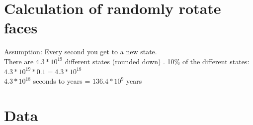 \documentclass[a4paper,11pt]{kth-mag}
\begin{document}
\renewcommand{\bibname}{References}



\appendix
\addappheadtotoc
\chapter{Calculation of randomly rotate faces}\label{appA}
Assumption: Every second you get to a new state.\\
There are $4.3*10^{19}$  different states (rounded down) \cite{Faculty}.
10\% of the different states:\\
$4.3*10^{19}*0.1=4.3*10^{18}$ \\
$4.3*10^{18}$ seconds to years = $136.4*10^{9}$ years
\cite{Wolfram}

\label{App:AppendixB}
\chapter{Data}
	
\end{document}
